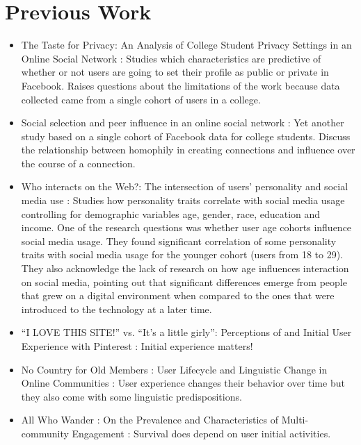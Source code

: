 \section{Previous Work}

\begin{itemize}
    \item The Taste for Privacy: An Analysis of College Student Privacy Settings in an Online Social Network \cite{Lewis2008}: Studies which characteristics are predictive of whether or not users are going to set their profile as public or private in Facebook. Raises questions about the limitations of the work because data collected came from a single cohort of users in a college.

    \item Social selection and peer influence in an online social network \cite{Lewis2012a}: Yet another study based on a single cohort of Facebook data for college students. Discuss the relationship between homophily in creating connections and influence over the course of a connection.

    \item Who interacts on the Web?: The intersection of users' personality and social media use \cite{Correa2010}: Studies how personality traits correlate with social media usage controlling for demographic variables age, gender, race, education and income. One of the research questions was whether user age cohorts influence social media usage. They found significant correlation of some personality traits with social media usage for the younger cohort (users from 18 to 29). They also acknowledge the lack of research on how age influences interaction on social media, pointing out that significant differences emerge from people that grew on a digital environment when compared to the ones that were introduced to the technology at a later time.

    \item ``I LOVE THIS SITE!'' vs. ``It's a little girly'': Perceptions of and Initial User Experience with Pinterest \cite{Miller2015}: Initial experience matters! 

    \item No Country for Old Members : User Lifecycle and Linguistic Change in Online Communities \cite{Danescu-niculescu-mizil2013}: User experience changes their behavior over time but they also come with some linguistic predispositions.

    \item All Who Wander : On the Prevalence and Characteristics of Multi-community Engagement \cite{Tan2015}: Survival does depend on user initial activities.


\end{itemize}
